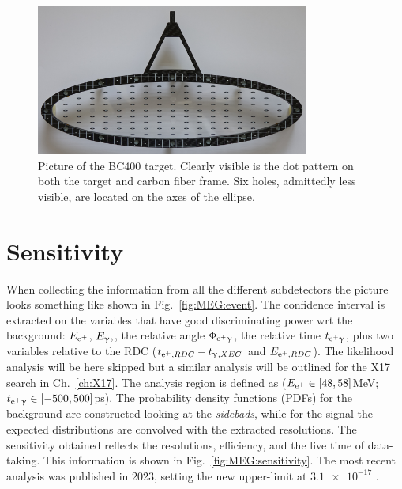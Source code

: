 \begin{refsection}
        \begin{figure}
            \centering
            \includegraphics[width = 0.8\textwidth]{Figures/MEG/meg_target.png}
            \caption[MEG II Target]{Picture of the BC400 target. Clearly visible is the dot pattern on both the target and carbon fiber frame. Six holes, admittedly less visible, are located on the axes of the ellipse.}
            \label{fig:meg:target}
        \end{figure}

\section{Sensitivity}  
    When collecting the information from all the different subdetectors the picture looks something like shown in Fig.~\ref{fig:MEG:event}.
    The confidence interval is extracted on the variables that have good discriminating power wrt the background: $E_{\text{e}^+}$, $E_\upgamma,$, the relative angle $\Phi_{\text{e}^+\upgamma}$, the relative time $t_{\text{e}^+\upgamma}$, plus two variables relative to the RDC ($t_{\text{e}^+, RDC}-t_{\upgamma, XEC}$ and $E_{\text{e}^+, RDC}$).
    The likelihood analysis will be here skipped but a similar analysis will be outlined for the X17 search in Ch.~\ref{ch:X17}.
    The analysis region is defined as ($E_{\text{e}^+}\in[48,58]$MeV; $t_{\text{e}^+\upgamma}\in[-500,500]$ps).
    The probability density functions (PDFs) for the background are constructed looking at the \textit{sidebads}, while for the signal the expected distributions are convolved with the extracted resolutions.
    The sensitivity obtained reflects the resolutions, efficiency, and the live time of data-taking. 
    This information is shown in Fig.~\ref{fig:MEG:sensitivity}.
    The most recent analysis was published in 2023, setting the new upper-limit at $\num{3.1e-17}$ \cite{MEG_II:physics}.
    

\end{refsection}
